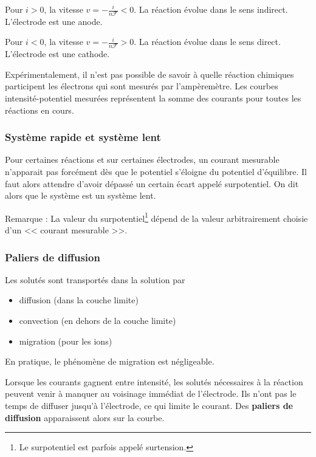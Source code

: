 Pour $i>0$, la vitesse $v=-\frac{i}{n\mathcal{F}}<0$. La réaction évolue dans le sens indirect. L'électrode est une anode.

Pour $i<0$, la vitesse $v=-\frac{i}{n\mathcal{F}}>0$. La réaction évolue dans le sens direct. L'électrode est une cathode.

Expérimentalement, il n'est pas possible de savoir à quelle réaction chimiques participent les électrons qui sont mesurés par l'ampèremètre. Les courbes intensité-potentiel mesurées représentent la somme des courants pour toutes les réactions en cours.

\subsubsection{Système rapide et système lent}
Pour certaines réactions et sur certaines électrodes, un courant mesurable n'apparait pas forcément dès que le potentiel s'éloigne du potentiel d'équilibre. Il faut alors attendre d'avoir dépassé un certain écart appelé surpotentiel. On dit alors que le système est un système lent.


Remarque : La valeur du surpotentiel\footnote{Le surpotentiel est parfois appelé surtension.} dépend de la valeur arbitrairement choisie d'un << courant mesurable >>.

\subsubsection{Paliers de diffusion}
Les solutés sont transportés dans la solution par
\begin{itemize}
\item diffusion (dans la couche limite)
\item convection (en dehors de la couche limite)
\item migration (pour les ions)
\end{itemize}
En pratique, le phénomène de migration est négligeable.

Lorsque les courants gagnent entre intensité, les solutés nécessaires à la réaction peuvent venir à manquer au voisinage immédiat de l'électrode. Ils n'ont pas le temps de diffuser jusqu'à l'électrode, ce qui limite le courant. Des \textbf{paliers de diffusion} apparaissent alors sur la courbe.


